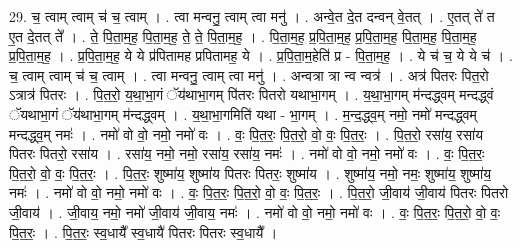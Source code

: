 \documentclass[17pt]{extarticle}
\begin{document}
29. च॒ त्वाम् त्वाम् च॑ च॒ त्वाम् । . त्वा मन्वनु॒ त्वाम् त्वा मनु॑ । . अन्वे॒त दे॒त दन्वन् वे॒तत् । . ए॒तत् ते॑ त ए॒त दे॒तत् ते᳚ । . ते॒ पि॒ता॒म॒ह॒ पि॒ता॒म॒ह॒ ते॒ ते॒ पि॒ता॒म॒ह॒ । . पि॒ता॒म॒ह॒ प्र॒पि॒ता॒म॒ह॒ प्र॒पि॒ता॒म॒ह॒ पि॒ता॒म॒ह॒ पि॒ता॒म॒ह॒ प्र॒पि॒ता॒म॒ह॒ । . प्र॒पि॒ता॒म॒ह॒ ये ये प्र॑पितामह प्रपितामह॒ ये । . प्र॒पि॒ता॒म॒हेति॑ प्र - पि॒ता॒म॒ह॒ । . ये च॑ च॒ ये ये च॑ । . च॒ त्वाम् त्वाम् च॑ च॒ त्वाम् । . त्वा मन्वनु॒ त्वाम् त्वा मनु॑ । . अन्वत्रा त्रा न्व न्वत्र॑ । . अत्र॑ पितरः पित॒रो ऽत्रात्र॑ पितरः । . पि॒त॒रो॒ य॒था॒भा॒गं ॅय॑थाभा॒गम् पि॑तरः पितरो यथाभा॒गम् । . य॒था॒भा॒गम् म॑न्दद्ध्वम् मन्दद्ध्वं ॅयथाभा॒गं ॅय॑थाभा॒गम् म॑न्दद्ध्वम् । . य॒था॒भा॒गमिति॑ यथा - भा॒गम् । . म॒न्द॒द्ध्व॒म् नमो॒ नमो॑ मन्दद्ध्वम् मन्दद्ध्व॒म् नमः॑ । . नमो॑ वो वो॒ नमो॒ नमो॑ वः । . वः॒ पि॒त॒रः॒ पि॒त॒रो॒ वो॒ वः॒ पि॒त॒रः॒ । . पि॒त॒रो॒ रसा॑य॒ रसा॑य पितरः पितरो॒ रसा॑य । . रसा॑य॒ नमो॒ नमो॒ रसा॑य॒ रसा॑य॒ नमः॑ । . नमो॑ वो वो॒ नमो॒ नमो॑ वः । . वः॒ पि॒त॒रः॒ पि॒त॒रो॒ वो॒ वः॒ पि॒त॒रः॒ । . पि॒त॒रः॒ शुष्मा॑य॒ शुष्मा॑य पितरः पितरः॒ शुष्मा॑य । . शुष्मा॑य॒ नमो॒ नमः॒ शुष्मा॑य॒ शुष्मा॑य॒ नमः॑ । . नमो॑ वो वो॒ नमो॒ नमो॑ वः । . वः॒ पि॒त॒रः॒ पि॒त॒रो॒ वो॒ वः॒ पि॒त॒रः॒ । . पि॒त॒रो॒ जी॒वाय॑ जी॒वाय॑ पितरः पितरो जी॒वाय॑ । . जी॒वाय॒ नमो॒ नमो॑ जी॒वाय॑ जी॒वाय॒ नमः॑ । . नमो॑ वो वो॒ नमो॒ नमो॑ वः । . वः॒ पि॒त॒रः॒ पि॒त॒रो॒ वो॒ वः॒ पि॒त॒रः॒ । . पि॒त॒रः॒ स्व॒धायै᳚ स्व॒धायै॑ पितरः पितरः स्व॒धायै᳚ । \newline
\end{document}

